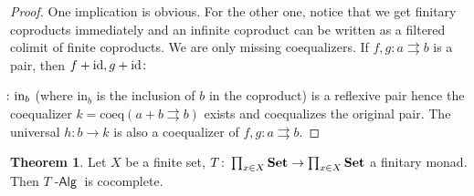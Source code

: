 \documentclass[a4paper,11pt,oneside,openany]{scrbook}
\newcommand{\catname}[1]{{\normalfont\textbf{#1}}}
\DeclareMathOperator{\Alg}{-\mathsf{Alg}}
\newcommand{\Set}{\catname{Set}}
\DeclareMathOperator{\id}{id}
\theoremstyle{definition}
\newtheorem{thm}{Theorem}[section] %
\theoremstyle{definition}
\begin{document}
\begin{proof}
One implication is obvious. For the other one, notice that we get finitary coproducts immediately and an infinite coproduct can be written as a filtered colimit of finite coproducts. We are only missing coequalizers. If $f,g\colon a\rightrightarrows b$ is a pair, then $f+\id,g+\id\colon\hspace{-1.5mm}$$\hspace{-1.5mm}\colon\text{in}_b$ (where in$_b$ is the inclusion of $b$ in the coproduct) is a reflexive pair hence the coequalizer $k=\text{coeq}(a+b\rightrightarrows b)$ exists and coequalizes the original pair. The universal $h\colon b\rightarrow k$ is also a coequalizer of $f,g\colon a\rightrightarrows b$.
\end{proof}
\begin{thm}
Let $X$ be a finite set, $T\colon\prod_{x\in X}\Set\to\prod_{x\in X}\Set$ a finitary monad. Then $T\Alg$ is cocomplete.
\end{thm}
\end{document}
